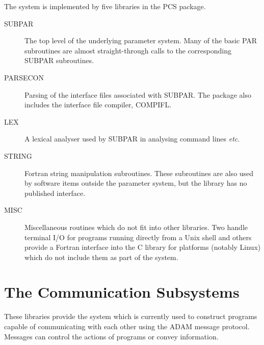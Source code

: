 \documentclass[twoside,11pt]{article}
\newcommand{\xlabel}[1]{}
\renewcommand{\_}{\texttt{\symbol{95}}}
\begin{document}
The system is implemented by five libraries in the PCS package.
\begin{description}
\item[SUBPAR] The top level of the underlying parameter system. Many
of the basic PAR subroutines are almost straight-through calls to the
corresponding SUBPAR subroutines.
\item[PARSECON] Parsing of the interface files associated with SUBPAR.
The package also includes the interface file compiler, COMPIFL.
\item[LEX] A lexical analyser used by SUBPAR in analysing command lines
\textit{etc}.
\item[STRING] Fortran string manipulation subroutines. These subroutines are
also used by software items outside the parameter system, but the library
has no published interface.
\item[MISC] Miscellaneous routines which do not fit into other libraries.
Two handle terminal I/O for programs running directly from a Unix shell
and others provide a Fortran interface into the C library for platforms
(notably Linux) which do not include them as part of the system.
\end{description}

\section{\xlabel{the_communication_subsystems}The Communication Subsystems}
These libraries provide the system which is currently used to construct
programs capable of communicating with each other using the ADAM message
protocol. Messages can control the actions of programs or convey information.
\end{document}
